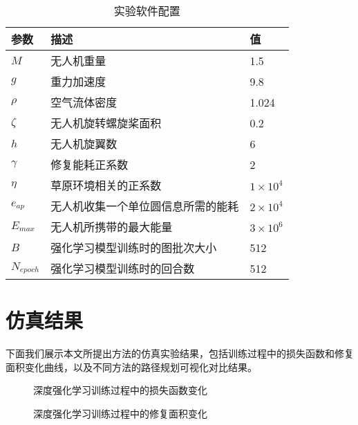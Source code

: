 \documentclass[AutoFakeBold]{LZUThesis}
\begin{document}
\label{sub:无人机参数表格}
\begin{table}[H]
	\centering
	\caption{实验软件配置}
	\begin{tabular}{lll} %
		\toprule
		参数              & 描述                & 值                   \\
		\midrule
		\( M \)         & 无人机重量             & 1.5                 \\
		\( g \)         & 重力加速度             & 9.8                 \\
		\( \rho \)      & 空气流体密度            & 1.024               \\
		\( \zeta \)     & 无人机旋转螺旋桨面积        & 0.2                 \\
		\( h \)         & 无人机旋翼数            & 6                   \\
		\( \gamma \)    & 修复能耗正系数           & 2                   \\
		\( \eta \)      & 草原环境相关的正系数        & \( 1 \times 10^4 \) \\
		\( e_{ap} \)    & 无人机收集一个单位圆信息所需的能耗 & \( 2 \times 10^4 \) \\
		\( E_{max} \)   & 无人机所携带的最大能量       & \( 3 \times 10^6 \) \\
		\( B \)         & 强化学习模型训练时的图批次大小   & 512                 \\
		\( N_{epoch} \) & 强化学习模型训练时的回合数     & 512                 \\
		\bottomrule
	\end{tabular}
	\label{tbl_drone_parameters}
\end{table}

\section{仿真结果}


下面我们展示本文所提出方法的仿真实验结果，包括训练过程中的损失函数和修复面积变化曲线，以及不同方法的路径规划可视化对比结果。

\begin{figure}[H]
	\centering
	
	\caption{深度强化学习训练过程中的损失函数变化}
	\label{fig:training_loss_curve}
\end{figure}

\begin{figure}[H]
	\centering
	
	\caption{深度强化学习训练过程中的修复面积变化}
	\label{fig:training_reward_curve}
\end{figure}
\end{document}
